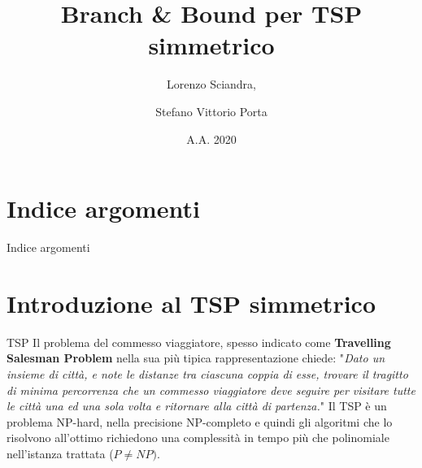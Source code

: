 \documentclass[10pt]{beamer}
\title{Branch \& Bound per TSP simmetrico}
\author{Lorenzo Sciandra, \and Stefano Vittorio Porta}
\date{A.A. 2020\-2021}
\institute{Università degli Studi di Torino}
\begin{document}
    \maketitle


    \section{Indice argomenti}\label{sec:indice-argomenti}

    \begin{frame}{Indice argomenti}
        \tableofcontents
    \end{frame}


    \section{Introduzione al TSP simmetrico}\label{sec:introduzione-al-TSP-simmetrico}
    \begin{frame}{TSP}
        Il problema del commesso viaggiatore, spesso indicato come \textbf{Travelling Salesman Problem} nella sua più tipica rappresentazione chiede:\newline
        "\textit{Dato un insieme di città, e note le distanze tra ciascuna coppia di esse, trovare il tragitto di minima percorrenza che un commesso viaggiatore deve seguire per visitare tutte le città una ed una sola volta e ritornare alla città di partenza.}"
        \newline
        \newline
        Il TSP è un problema NP-hard, nella precisione NP-completo e quindi gli algoritmi che lo risolvono all'ottimo richiedono una complessità in tempo più che polinomiale nell'istanza trattata ($P \neq NP)$.
    \end{frame}
\end{document}
